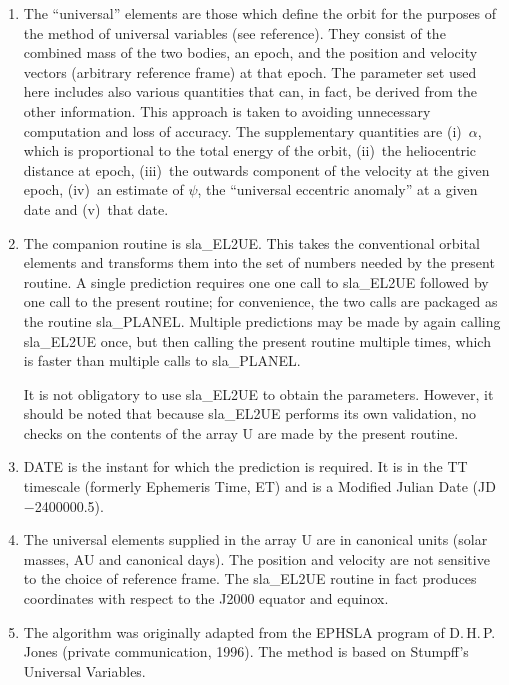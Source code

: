 \documentclass[11pt,twoside]{article}
\begin{document}
{
 \begin{enumerate}
  \setlength{\parskip}{\medskipamount}
  \item The ``universal'' elements are those which define the orbit for the
        purposes of the method of universal variables (see reference).
        They consist of the combined mass of the two bodies, an epoch,
        and the position and velocity vectors (arbitrary reference frame)
        at that epoch.  The parameter set used here includes also various
        quantities that can, in fact, be derived from the other
        information.  This approach is taken to avoiding unnecessary
        computation and loss of accuracy.  The supplementary quantities
        are (i)~$\alpha$, which is proportional to the total energy of the
        orbit, (ii)~the heliocentric distance at epoch,
        (iii)~the outwards component of the velocity at the given epoch,
        (iv)~an estimate of $\psi$, the ``universal eccentric anomaly'' at a
        given date and (v)~that date.
  \item The companion routine is sla\_EL2UE.  This takes the conventional
        orbital elements and transforms them into the set of numbers
        needed by the present routine.  A single prediction requires one
        one call to sla\_EL2UE followed by one call to the present routine;
        for convenience, the two calls are packaged as the routine
        sla\_PLANEL.  Multiple predictions may be made by again
        calling sla\_EL2UE once, but then calling the present routine
        multiple times, which is faster than multiple calls to sla\_PLANEL.

        It is not obligatory to use sla\_EL2UE to obtain the parameters.
        However, it should be noted that because sla\_EL2UE performs its
        own validation, no checks on the contents of the array U are made
        by the present routine.
  \item DATE is the instant for which the prediction is required.  It is
        in the TT timescale (formerly Ephemeris Time, ET) and is a
        Modified Julian Date (JD$-$2400000.5).
  \item The universal elements supplied in the array U are in canonical
        units (solar masses, AU and canonical days).  The position and
        velocity are not sensitive to the choice of reference frame.  The
        sla\_EL2UE routine in fact produces coordinates with respect to the
        J2000 equator and equinox.
  \item The algorithm was originally adapted from the EPHSLA program of
        D.\,H.\,P.\,Jones (private communication, 1996).  The method
        is based on Stumpff's Universal Variables.
 \end{enumerate}
}
\end{document}

